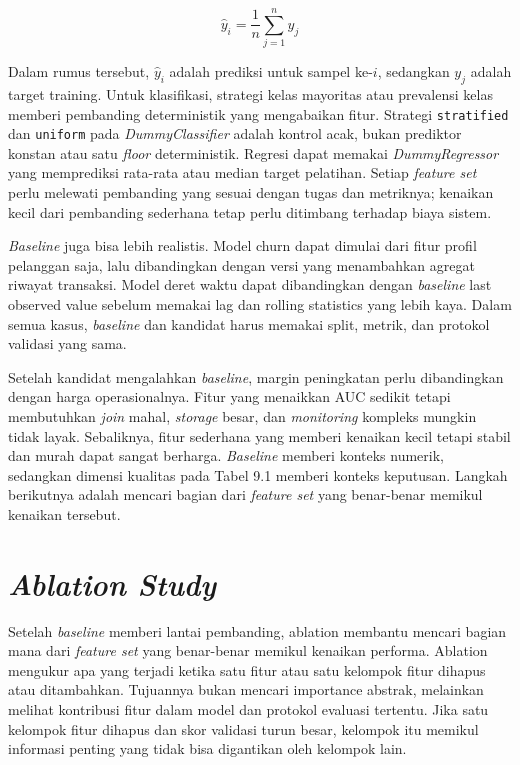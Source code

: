 \[
\hat{y}_i = \dfrac{1}{n}\sum_{j=1}^{n} y_j
\]

Dalam rumus tersebut, \(\hat{y}_i\) adalah prediksi untuk sampel ke-\(i\), sedangkan \(y_j\) adalah target training. Untuk klasifikasi, strategi kelas mayoritas atau prevalensi kelas memberi pembanding deterministik yang mengabaikan fitur. Strategi \passthrough{\lstinline!stratified!} dan \passthrough{\lstinline!uniform!} pada \emph{DummyClassifier} adalah kontrol acak, bukan prediktor konstan atau satu \emph{floor} deterministik. Regresi dapat memakai \emph{DummyRegressor} yang memprediksi rata-rata atau median target pelatihan. Setiap \emph{feature set} perlu melewati pembanding yang sesuai dengan tugas dan metriknya; kenaikan kecil dari pembanding sederhana tetap perlu ditimbang terhadap biaya sistem.

\emph{Baseline} juga bisa lebih realistis. Model churn dapat dimulai dari fitur profil pelanggan saja, lalu dibandingkan dengan versi yang menambahkan agregat riwayat transaksi. Model deret waktu dapat dibandingkan dengan \emph{baseline} last observed value sebelum memakai lag dan rolling statistics yang lebih kaya. Dalam semua kasus, \emph{baseline} dan kandidat harus memakai split, metrik, dan protokol validasi yang sama.

Setelah kandidat mengalahkan \emph{baseline}, margin peningkatan perlu dibandingkan dengan harga operasionalnya. Fitur yang menaikkan AUC sedikit tetapi membutuhkan \emph{join} mahal, \emph{storage} besar, dan \emph{monitoring} kompleks mungkin tidak layak. Sebaliknya, fitur sederhana yang memberi kenaikan kecil tetapi stabil dan murah dapat sangat berharga. \emph{Baseline} memberi konteks numerik, sedangkan dimensi kualitas pada Tabel 9.1 memberi konteks keputusan. Langkah berikutnya adalah mencari bagian dari \emph{feature set} yang benar-benar memikul kenaikan tersebut.

\section{\texorpdfstring{\emph{Ablation Study}}{Ablation Study}}\label{ablation-study}

Setelah \emph{baseline} memberi lantai pembanding, ablation membantu mencari bagian mana dari \emph{feature set} yang benar-benar memikul kenaikan performa. Ablation mengukur apa yang terjadi ketika satu fitur atau satu kelompok fitur dihapus atau ditambahkan. Tujuannya bukan mencari importance abstrak, melainkan melihat kontribusi fitur dalam model dan protokol evaluasi tertentu. Jika satu kelompok fitur dihapus dan skor validasi turun besar, kelompok itu memikul informasi penting yang tidak bisa digantikan oleh kelompok lain.

